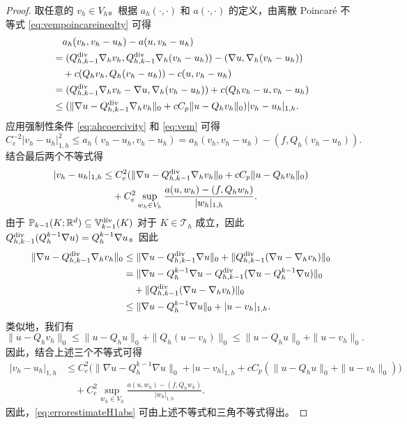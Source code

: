 \begin{proof}
取任意的 $v_h\in V_h$。根据 $a_h(\cdot, \cdot)$ 和 $a(\cdot, \cdot)$ 的定义，由离散 Poincaré 不等式 \eqref{eq:vempoincareineqlty} 可得
\begin{align*}
&\quad a_h(v_h, v_h-u_h)-a(u,v_h-u_h)\\
&=(Q_{h,k-1}^{\operatorname{div}}\nabla_h v_h, Q_{h,k-1}^{\operatorname{div}}\nabla_h(v_h-u_h))-(\nabla u, \nabla_h(v_h-u_h))\\
&\quad +c(Q_hv_h, Q_h(v_h-u_h))-c(u, v_h-u_h) \\
&=(Q_{h,k-1}^{\operatorname{div}}\nabla_h v_h-\nabla u, \nabla_h(v_h-u_h))+c(Q_hv_h-u,v_h-u_h)\\
&\leq (\|\nabla u-Q_{h,k-1}^{\operatorname{div}}\nabla_h v_h\|_0+c C_p\|u-Q_hv_h\|_0)|v_h-u_h|_{1,h}.
\end{align*}
应用强制性条件 \eqref{eq:ahcoercivity} 和 \eqref{eq:vem} 可得
\begin{equation*}
C_e^{-2}|v_h-u_h|_{1,h}^2\leq a_h(v_h-u_h, v_h-u_h)=a_h(v_h, v_h-u_h)-(f, Q_h(v_h-u_h)).
\end{equation*}
结合最后两个不等式得
\begin{align*}
|v_h-u_h|_{1,h}&\leq C_e^2(\|\nabla u-Q_{h,k-1}^{\operatorname{div}}\nabla_h v_h\|_0+c C_p\|u-Q_hv_h\|_0) \\
&\quad + C_e^2\sup_{w_h\in V_h}\frac{a(u,w_h)-(f, Q_hw_h)}{|w_h|_{1,h}}.
\end{align*}
由于 $\mathbb P_{k-1}(K;\mathbb R^d)\subseteq\mathbb{V}_{k-1}^{\rm div}(K)$ 对于 $K\in\mathcal T_h$ 成立，因此 $Q_{h,k-1}^{\operatorname{div}}(Q_h^{k-1}\nabla u)=Q_h^{k-1}\nabla u$。因此
\begin{align*}
\|\nabla u-Q_{h,k-1}^{\operatorname{div}}\nabla_h v_h\|_0&\leq \|\nabla u-Q_{h,k-1}^{\operatorname{div}}\nabla u\|_0+\|Q_{h,k-1}^{\operatorname{div}}(\nabla u-\nabla_h v_h)\|_0\\
&= \|\nabla u-Q_h^{k-1}\nabla u-Q_{h,k-1}^{\operatorname{div}}(\nabla u-Q_h^{k-1}\nabla u)\|_0\\
&\quad+\|Q_{h,k-1}^{\operatorname{div}}(\nabla u-\nabla_h v_h)\|_0 \\
&\leq \|\nabla u-Q_h^{k-1}\nabla u\|_0+|u-v_h|_{1,h}.
\end{align*}
类似地，我们有
\[
\|u-Q_hv_h\|_0\leq \|u-Q_hu\|_0+\|Q_h(u-v_h)\|_0\leq \|u-Q_hu\|_0+\|u-v_h\|_0.
\]
因此，结合上述三个不等式可得
\begin{align*}
|v_h-u_h|_{1,h}&\leq C_e^2\big(\|\nabla u-Q_h^{k-1}\nabla u\|_0+|u-v_h|_{1,h}+c C_p(\|u-Q_hu\|_0+\|u-v_h\|_0)\big) \\
&\quad + C_e^2\sup_{w_h\in V_h}\frac{a(u,w_h)-(f, Q_hw_h)}{|w_h|_{1,h}}.
\end{align*}
因此，\eqref{eq:errorestimateH1abs} 可由上述不等式和三角不等式得出。


\end{proof}

